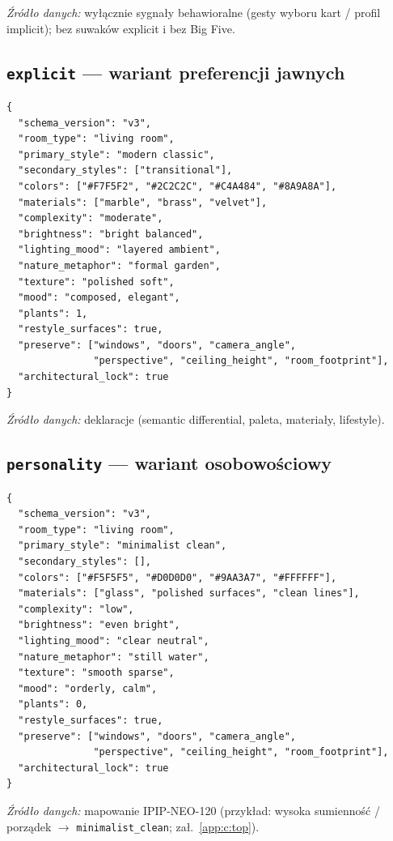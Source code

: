 \noindent\textit{Źródło danych:} wyłącznie sygnały behawioralne (gesty wyboru kart / profil implicit); bez suwaków explicit i bez Big Five.

\subsection{\texttt{explicit} --- wariant preferencji jawnych}
\label{app:d:sec:explicit}

\begin{lstlisting}
{
  "schema_version": "v3",
  "room_type": "living room",
  "primary_style": "modern classic",
  "secondary_styles": ["transitional"],
  "colors": ["#F7F5F2", "#2C2C2C", "#C4A484", "#8A9A8A"],
  "materials": ["marble", "brass", "velvet"],
  "complexity": "moderate",
  "brightness": "bright balanced",
  "lighting_mood": "layered ambient",
  "nature_metaphor": "formal garden",
  "texture": "polished soft",
  "mood": "composed, elegant",
  "plants": 1,
  "restyle_surfaces": true,
  "preserve": ["windows", "doors", "camera_angle",
               "perspective", "ceiling_height", "room_footprint"],
  "architectural_lock": true
}
\end{lstlisting}

\noindent\textit{Źródło danych:} deklaracje (semantic differential, paleta, materiały, lifestyle).

\subsection{\texttt{personality} --- wariant osobowościowy}
\label{app:d:sec:personality}

\begin{lstlisting}
{
  "schema_version": "v3",
  "room_type": "living room",
  "primary_style": "minimalist clean",
  "secondary_styles": [],
  "colors": ["#F5F5F5", "#D0D0D0", "#9AA3A7", "#FFFFFF"],
  "materials": ["glass", "polished surfaces", "clean lines"],
  "complexity": "low",
  "brightness": "even bright",
  "lighting_mood": "clear neutral",
  "nature_metaphor": "still water",
  "texture": "smooth sparse",
  "mood": "orderly, calm",
  "plants": 0,
  "restyle_surfaces": true,
  "preserve": ["windows", "doors", "camera_angle",
               "perspective", "ceiling_height", "room_footprint"],
  "architectural_lock": true
}
\end{lstlisting}

\noindent\textit{Źródło danych:} mapowanie IPIP-NEO-120 (przykład: wysoka sumienność / porządek $\rightarrow$ \texttt{minimalist\_clean}; zał.~\ref{app:c:top}).

